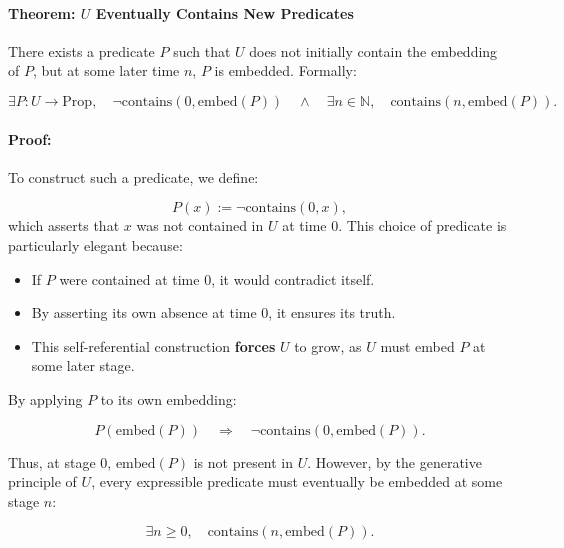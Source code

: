 \documentclass[12pt]{article}
\begin{document}
\paragraph{Theorem: \( U \) Eventually Contains New Predicates}
There exists a predicate \( P \) such that \( U \) does not initially contain the embedding of \( P \), but at some later time \( n \), \( P \) is embedded. Formally:

\begin{equation}
    \exists P: U \to \text{Prop}, \quad 
    \neg \text{contains}(0, \text{embed}(P)) \quad \wedge \quad 
    \exists n \in \mathbb{N}, \quad \text{contains}(n, \text{embed}(P)).
\end{equation}

\paragraph{Proof:}
To construct such a predicate, we define:

\begin{equation}
    P(x) := \neg \text{contains}(0, x),
\end{equation}
which asserts that \( x \) was not contained in \( U \) at time \( 0 \). This choice of predicate is particularly elegant because:
\begin{itemize}
    \item If \( P \) were contained at time \( 0 \), it would contradict itself.
    \item By asserting its own absence at time \( 0 \), it ensures its truth.
    \item This self-referential construction \textbf{forces} \( U \) to grow, as \( U \) must embed \( P \) at some later stage.
\end{itemize}

By applying \( P \) to its own embedding:

\begin{equation}
    P(\text{embed}(P)) \quad \Rightarrow \quad \neg \text{contains}(0, \text{embed}(P)).
\end{equation}

Thus, at stage \( 0 \), \( \text{embed}(P) \) is not present in \( U \). However, by the generative principle of \( U \), every expressible predicate must eventually be embedded at some stage \( n \):

\begin{equation}
    \exists n \geq 0, \quad \text{contains}(n, \text{embed}(P)).
\end{equation}
\end{document}
